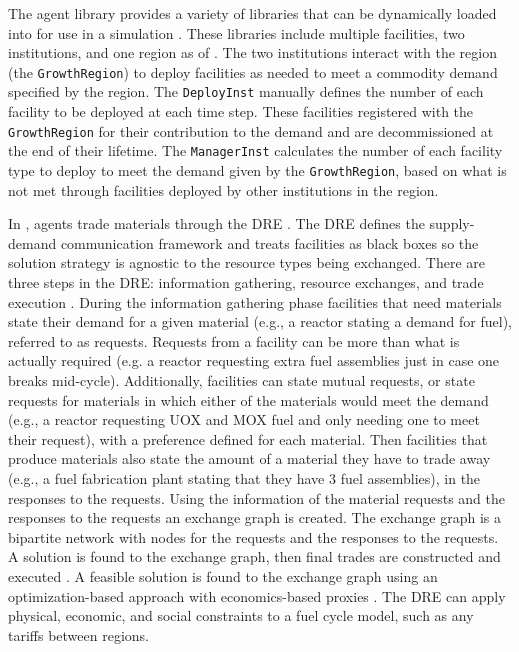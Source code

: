 The \Cycamore agent library provides a variety of libraries that can be 
dynamically loaded into \Cyclus for use in a simulation 
\cite{huff_fundamental_2016,carlsen_cycamore_2014}. These libraries 
include multiple facilities, two institutions, and one region as of 
 \cite{huff_fundamental_2016}. The two institutions interact 
with the region (the \Cycamore \texttt{GrowthRegion}) to deploy 
facilities as needed to meet a commodity demand specified by the region. 
The \Cycamore \texttt{DeployInst} manually defines the number of each 
facility to be deployed at each time step. These facilities 
registered with the \Cycamore \texttt{GrowthRegion} for their 
contribution to the demand and are decommissioned at the end of their 
lifetime. The 
\Cycamore \texttt{ManagerInst} calculates the number of each facility 
type to deploy to meet the demand given by the \texttt{GrowthRegion}, 
based on what is not met through facilities deployed by other institutions 
in the region.  

In \Cyclus, agents trade materials through the \gls{DRE} 
\cite{gidden_agent-based_2015,huff_fundamental_2016}. The \gls{DRE} defines the 
supply-demand communication framework and treats facilities as black boxes
so the solution strategy is agnostic to the resource types being exchanged. 
There are three steps in the \gls{DRE}: information gathering, resource 
exchanges, and trade execution \cite{gidden_agent-based_2015}. 
During the information gathering 
phase facilities that need materials state their demand for a given 
material (e.g., a reactor stating a demand for fuel), referred to 
as requests. Requests 
from a facility can be more than what is actually required (e.g. a reactor
requesting extra fuel assemblies just in case one breaks mid-cycle). Additionally, 
facilities can state mutual requests, or state requests for materials in 
which either of the materials would meet the demand (e.g., a reactor 
requesting UOX and MOX fuel and only needing one to meet their request), with 
a preference defined for each material.
Then facilities that produce materials also state the amount of a material 
they have to trade away (e.g., a fuel fabrication plant stating that they have 
3 fuel assemblies), in the responses to the requests. Using the information of 
the material requests and the responses to the requests an exchange graph is 
created. The exchange graph is a bipartite network \cite{gidden_agent-based_2015}
with nodes for the requests and the responses to the requests. 
A solution is found to the 
exchange graph, then final trades are constructed and executed 
\cite{gidden_methodology_2016}. A feasible solution is found to the 
exchange graph using an optimization-based 
approach with economics-based proxies \cite{gidden_methodology_2016}. 
The \gls{DRE} can apply physical, economic, and social 
constraints to a fuel cycle model, such as any tariffs between regions. 

